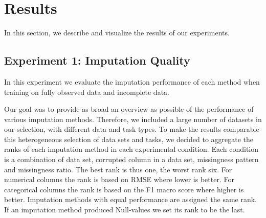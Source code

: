 \section{Results}
\label{sec:results}


In this section, we describe and visualize the results of our experiments.



\subsection{Experiment 1: Imputation Quality}

In this experiment we evaluate the imputation performance of each method when training on fully observed data and incomplete data.

Our goal was to provide as broad an overview as possible of the performance of various imputation methods. Therefore, we included a large number of datasets in our selection, with different data and task types. To make the results comparable this heterogeneous selection of data sets and tasks, we decided to aggregate the ranks of each imputation method in each experimental condition. Each condition is a combination of data set, corrupted column in a data set, missingness pattern and missingness ratio. The best rank is thus one, the worst rank six. For numerical columns the rank is based on RMSE where lower is better. For categorical columns the rank is based on the F1 macro score where higher is better. Imputation methods with equal performance are assigned the same rank. If an imputation method produced Null-values we set its rank to be the last.


